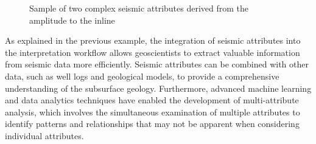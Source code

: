 \begin{figure}[htb!]
    \captionsetup[subfigure]{justification=centering}
    \centering

    

    \caption{Sample of two complex seismic attributes derived from the amplitude to the inline}
    \label{fig:seismic-complex-attr}
\end{figure}

As explained in the previous example, the integration of seismic attributes into the interpretation workflow allows geoscientists to extract valuable information from seismic data more efficiently.
Seismic attributes can be combined with other data, such as well logs and geological models, to provide a comprehensive understanding of the subsurface geology.
Furthermore, advanced machine learning and data analytics techniques have enabled the development of multi-attribute analysis, which involves the simultaneous examination of multiple attributes to identify patterns and relationships that may not be apparent when considering individual attributes.

